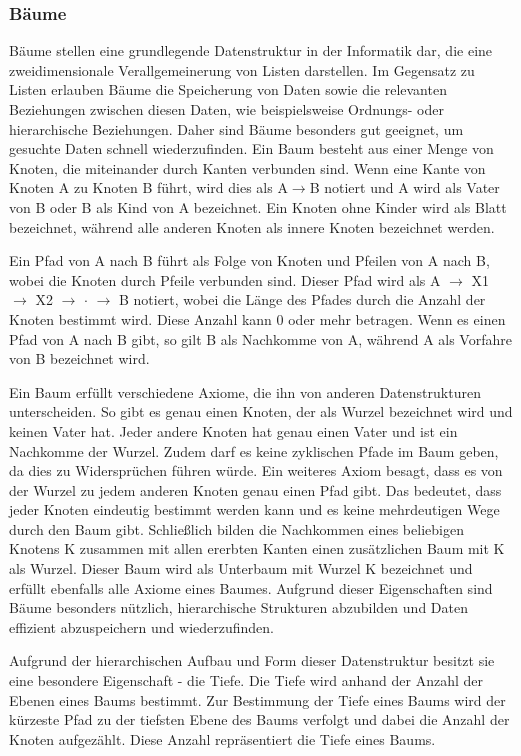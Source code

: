 \subsubsection{Bäume}
Bäume stellen eine grundlegende Datenstruktur in der Informatik dar, die eine zweidimensionale Verallgemeinerung von Listen darstellen. Im Gegensatz zu Listen erlauben Bäume die Speicherung von Daten sowie die relevanten Beziehungen zwischen diesen Daten, wie beispielsweise Ordnungs- oder hierarchische Beziehungen. Daher sind Bäume besonders gut geeignet, um gesuchte Daten schnell wiederzufinden. Ein Baum besteht aus einer Menge von Knoten, die miteinander durch Kanten verbunden sind. Wenn eine Kante von Knoten A zu Knoten B führt, wird dies als A$\rightarrow$B notiert und A wird als Vater von B oder B als Kind von A bezeichnet. Ein Knoten ohne Kinder wird als Blatt bezeichnet, während alle anderen Knoten als innere Knoten bezeichnet werden. \autocite[389]{gumm_band_2016}

Ein Pfad von A nach B führt als Folge von Knoten und Pfeilen von A nach B, wobei die Knoten durch Pfeile verbunden sind. Dieser Pfad wird als A $\rightarrow$ X1 $\rightarrow$ X2 $\rightarrow$ $\cdot$ $\rightarrow$ B notiert, wobei die Länge des Pfades durch die Anzahl der Knoten bestimmt wird. Diese Anzahl kann 0 oder mehr betragen. Wenn es einen Pfad von A nach B gibt, so gilt B als Nachkomme von A, während A als Vorfahre von B bezeichnet wird. \autocite[389]{gumm_band_2016}

Ein Baum erfüllt verschiedene Axiome, die ihn von anderen Datenstrukturen unterscheiden. So gibt es genau einen Knoten, der als Wurzel bezeichnet wird und keinen Vater hat. Jeder andere Knoten hat genau einen Vater und ist ein Nachkomme der Wurzel. Zudem darf es keine zyklischen Pfade im Baum geben, da dies zu Widersprüchen führen würde. Ein weiteres Axiom besagt, dass es von der Wurzel zu jedem anderen Knoten genau einen Pfad gibt. Das bedeutet, dass jeder Knoten eindeutig bestimmt werden kann und es keine mehrdeutigen Wege durch den Baum gibt. Schließlich bilden die Nachkommen eines beliebigen Knotens K zusammen mit allen ererbten Kanten einen zusätzlichen Baum mit K als Wurzel. Dieser Baum wird als Unterbaum mit Wurzel K bezeichnet und erfüllt ebenfalls alle Axiome eines Baumes. Aufgrund dieser Eigenschaften sind Bäume besonders nützlich, hierarchische Strukturen abzubilden und Daten effizient abzuspeichern und wiederzufinden. \autocite[389]{gumm_band_2016}

Aufgrund der hierarchischen Aufbau und Form dieser Datenstruktur besitzt sie eine besondere Eigenschaft - die Tiefe. Die Tiefe wird anhand der Anzahl der Ebenen eines Baums bestimmt. Zur Bestimmung der Tiefe eines Baums wird der kürzeste Pfad zu der tiefsten Ebene des Baums verfolgt und dabei die Anzahl der Knoten aufgezählt. Diese Anzahl repräsentiert die Tiefe eines Baums. \autocite[390]{gumm_band_2016}

